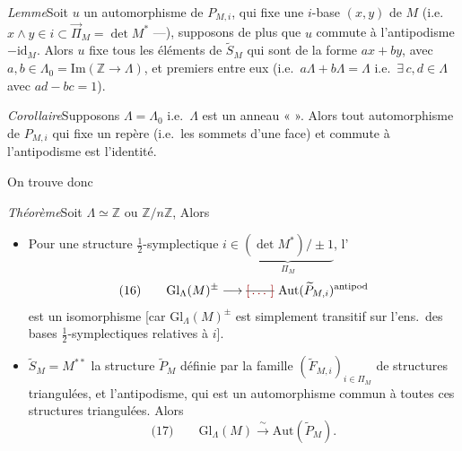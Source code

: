 \documentclass[11pt,a4paper]{article}
\begin{document}
\emph{Lemme}\quad Soit $u$ un automorphisme de $P_{M,i}$, qui fixe  une $i$-base $(x,y)$ de $M$ (i.e.\ $x\wedge y\in i\subset\overrightarrow{\Pi}_M=\det M^{*}$ ---),  supposons de plus que $u$ commute à l'antipodisme $-\mathrm{id}_M$. Alors $u$ fixe  tous les éléments de $\widetilde{S}_M$ qui sont de la forme $ax+by$, avec $a,b\in\Lambda_0=\mathrm{Im}(\mathbb{Z}\to\Lambda)$, et premiers entre eux (i.e.\ $a\Lambda+b\Lambda=\Lambda$ i.e.\ $\exists\, c,d\in\Lambda$ avec $ad-bc=1$).

\emph{Corollaire}\quad Supposons $\Lambda=\Lambda_0$ i.e.\ $\Lambda$ est un anneau «  ». Alors tout automorphisme de $P_{M,i}$ qui fixe un repère (i.e.\ les sommets d'une face) et commute à l'antipodisme est l'identité.

On trouve donc

\emph{Théorème}\quad Soit $\Lambda\simeq\mathbb{Z}$ ou $\mathbb{Z}/n\mathbb{Z}$,  Alors
\begin{itemize}
\item[a)] Pour une structure $\tfrac12$-symplectique $i\in\underset{\Pi_M}{\underbrace{(\det M^{*})/\pm1}}$, l' 
\[
\text{(16)}\qquad \mathrm{Gl}_\Lambda(M)^{\pm} \longrightarrow \text{\struck{\ill{}}}\ \mathrm{Aut}(\widetilde{P}_{M,i})^{\text{antipod}}
\]
 est un isomorphisme [car $\mathrm{Gl}_\Lambda(M)^{\pm}$ est simplement transitif sur l'ens.\ des bases $\tfrac12$-symplectiques relatives à $i$].
\item[b)] \struck{\ill{}}  $\widetilde{S}_M=M^{**}$ la structure $\widetilde{P}_M$ définie par la famille $(\widetilde{F}_{M,i})_{i\in\Pi_M}$ de structures triangulées, et l'antipodisme, qui est un automorphisme commun à toutes ces structures triangulées. Alors
\[
\text{(17)}\qquad \mathrm{Gl}_\Lambda(M) \xrightarrow{\ \sim\ } \mathrm{Aut}(\widetilde{P}_M) .
\]
\end{itemize}
\end{document}
